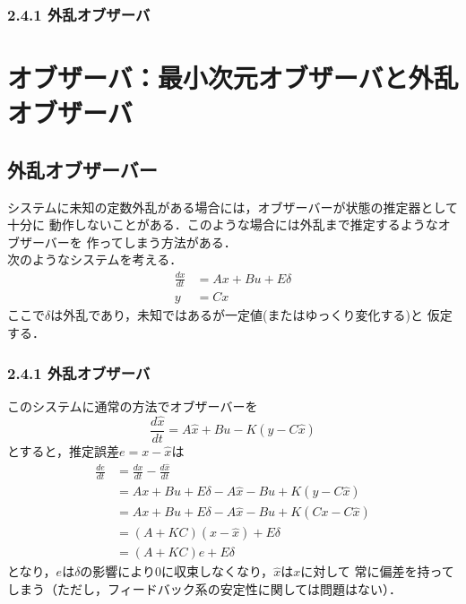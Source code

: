 \begin{frame}[t]
\frametitle{2.4.1 外乱オブザーバ}

\section{オブザーバ：最小次元オブザーバと外乱オブザーバ}



\subsection{外乱オブザーバー}
システムに未知の定数外乱がある場合には，オブザーバーが状態の推定器として十分に
動作しないことがある．このような場合には外乱まで推定するようなオブザーバーを
作ってしまう方法がある．
\\[3mm]

次のようなシステムを考える．
\begin{align}
 \frac{dx}{dt} &= A x + B u + E \delta \nonumber \\
 y             &= C x
\end{align}
ここで$\delta$は外乱であり，未知ではあるが一定値(またはゆっくり変化する)と
仮定する．
\end{frame}

\begin{frame}[t]
\frametitle{2.4.1 外乱オブザーバ}
このシステムに通常の方法でオブザーバーを
\begin{equation}
 \frac{d \hat{x}}{dt} = A \hat{x} + B u - K(y - C \hat{x})
\end{equation}
とすると，推定誤差$e = x - \hat{x}$は
\begin{align}
 \frac{de}{dt} &= \frac{dx}{dt} - \frac{d\hat{x}}{dt} \nonumber \\
 &= Ax + Bu + E \delta - A\hat{x} - Bu + K(y - C \hat{x}) \nonumber \\
 &= Ax + Bu + E \delta - A\hat{x} - Bu + K(Cx - C \hat{x}) \nonumber  \\
 &= (A+KC)(x-\hat{x}) + E \delta \nonumber \\
 &= (A+KC)e + E \delta
\end{align}
となり，$e$は$\delta$の影響により$0$に収束しなくなり，$\hat{x}$は$x$に対して
常に偏差を持ってしまう（ただし，フィードバック系の安定性に関しては問題はない）．
\end{frame}

